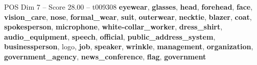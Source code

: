 \begin{textsample}{POS Dim 7 – Score 28.00 – t009308}  \label{ex:f7_pos_011}
\textbf{eyewear}, \textbf{glasses}, \textbf{head}, \textbf{forehead}, \textbf{face}, \textbf{vision\_care}, \textbf{nose}, \textbf{formal\_wear}, \textbf{suit}, \textbf{outerwear}, \textbf{necktie}, \textbf{blazer}, \textbf{coat}, \textbf{spokesperson}, \textbf{microphone}, \textbf{white-collar\_worker}, \textbf{dress\_shirt}, \textbf{audio\_equipment}, \textbf{speech}, \textbf{official}, \textbf{public\_address\_system}, \textbf{businessperson}, logo, \textbf{job}, \textbf{speaker}, \textbf{wrinkle}, \textbf{management}, \textbf{organization}, \textbf{government\_agency}, \textbf{news\_conference}, \textbf{flag}, \textbf{government}

\end{textsample}
